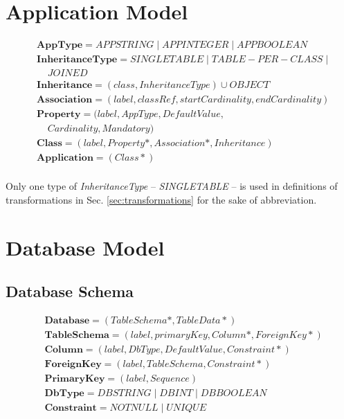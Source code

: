 \documentclass[10pt]{article}
\begin{document}
\section{Application Model}
\begin{align}
& \mathbf{AppType} = APPSTRING \;|\; APPINTEGER \;|\; APPBOOLEAN \\
& \mathbf{InheritanceType} = SINGLETABLE \; | \; TABLE-PER-CLASS  \; |  \; \\ & \;\;\;\;   JOINED\\
& \mathbf{Inheritance} = (class, InheritanceType) \cup OBJECT \\
& \mathbf{Association} = (label, classRef, startCardinality, endCardinality)  \\
& \mathbf{Property} = (label, AppType, DefaultValue, \nonumber \\ & \;\;\;\;  Cardinality, Mandatory) \\
& \mathbf{Class} = (label, Property*, Association*, Inheritance) \\
& \mathbf{Application} = (Class*) \\
\end{align}

Only one type of \emph{InheritanceType} -- \emph{SINGLETABLE} -- is used in definitions of transformations in Sec. \ref{sec:transformations} for the sake of abbreviation. 


\section{Database Model}
\subsection{Database Schema}
\begin{align}
&	\mathbf{Database} = ( TableSchema*, TableData* )\\
&	\mathbf{TableSchema} = (label, primaryKey, Column*, ForeignKey*)\\
&	\mathbf{Column} = (label, DbType, DefaultValue, Constraint*) \\
&	\mathbf{ForeignKey} = (label, TableSchema, Constraint*) \\
&	\mathbf{PrimaryKey} =  ( label, Sequence ) \\
&	\mathbf{DbType} = DBSTRING \; | \; DBINT \; | \; DBBOOLEAN\\
&	\mathbf{Constraint} = NOTNULL \; | \; UNIQUE 
\end{align}
\end{document}
